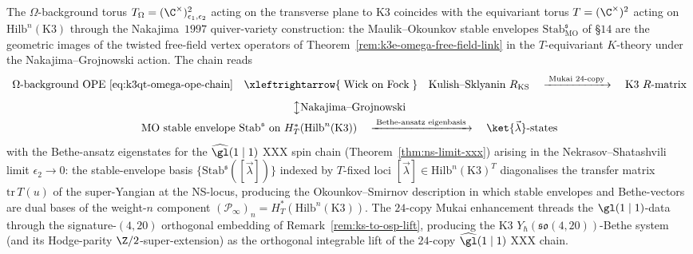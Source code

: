 \begin{remark}
\label{rem:k3qt-omega-to-mo-chain}
The $\Omega$-background torus
$T_\Omega = (\C^\times)^2_{\epsilon_1, \epsilon_2}$ acting on the
transverse plane to K3 coincides with the equivariant torus
$T = (\C^\times)^2$ acting on $\mathrm{Hilb}^n(\mathrm K3)$ through
the Nakajima~$1997$ quiver-variety construction: the Maulik--Okounkov
stable envelopes $\mathrm{Stab}^{\mathfrak s}_{\mathrm{MO}}$ of
\cite{MaulikOkounkov2019} \S$14$ are the geometric images of the
twisted free-field vertex operators of
Theorem~\ref{rem:k3e-omega-free-field-link} in the $T$-equivariant
$K$-theory under the Nakajima--Grojnowski action. The chain reads
\[
\renewcommand{\arraystretch}{1.4}
\begin{array}{c}
\text{$\Omega$-background OPE \eqref{eq:k3qt-omega-ope-chain}}
 \quad\xleftrightarrow{\;\text{Wick on Fock}\;}\quad
 \text{Kulish--Sklyanin $R_{\mathrm{KS}}$}
 \quad\xrightarrow{\;\text{Mukai $24$-copy}\;}\quad
 \text{K3 $R$-matrix} \\[4pt]
 \big\updownarrow \text{Nakajima--Grojnowski} \\[2pt]
 \text{MO stable envelope $\mathrm{Stab}^{\mathfrak s}$ on
 $H^*_T(\mathrm{Hilb}^n(\mathrm K3))$}
 \quad\xrightarrow{\;\text{Bethe-ansatz eigenbasis}\;}\quad
 \text{$\ket{\vec\lambda}$-states}
\end{array}
\]
with the Bethe-ansatz eigenstates for the $\widehat{\gl}(1 \mid 1)$
XXX spin chain (Theorem~\ref{thm:ns-limit-xxx}) arising in the
Nekrasov--Shatashvili limit $\epsilon_2 \to 0$: the stable-envelope
basis $\{\mathrm{Stab}^{\mathfrak s}([\vec\lambda])\}$ indexed by
$T$-fixed loci $[\vec\lambda] \in \mathrm{Hilb}^n(\mathrm K3)^T$
diagonalises the transfer matrix $\mathrm{tr}\, T(u)$ of the
super-Yangian at the NS-locus, producing the Okounkov--Smirnov
\cite{Smirnov2020} description in which stable envelopes and
Bethe-vectors are dual bases of the weight-$n$ component
$(\mathcal P_\infty)_n = H^*_T(\mathrm{Hilb}^n(\mathrm K3))$.
The $24$-copy Mukai enhancement threads the $\gl(1 \mid 1)$-data
through the signature-$(4, 20)$ orthogonal embedding of
Remark~\ref{rem:ks-to-osp-lift}, producing the K$3$
$Y_\hbar(\mathfrak{so}(4, 20))$-Bethe system (and its Hodge-parity
$\Z/2$-super-extension) as the orthogonal integrable lift of the
$24$-copy $\widehat{\gl}(1 \mid 1)$ XXX chain.
\end{remark}

